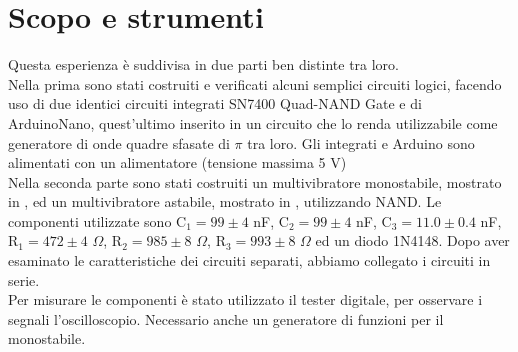 \section{Scopo e strumenti}
Questa esperienza è suddivisa in due parti ben distinte tra loro.\\
Nella prima sono stati costruiti e verificati alcuni semplici circuiti logici, facendo uso di due identici circuiti integrati SN7400 Quad-NAND 
Gate e di ArduinoNano, quest'ultimo inserito in un circuito che lo renda utilizzabile come generatore di onde quadre sfasate di $\pi$ tra loro. Gli integrati e Arduino sono alimentati con un alimentatore (tensione massima 5 V)\\
Nella seconda parte sono stati costruiti un multivibratore monostabile, mostrato in , ed un multivibratore astabile, mostrato in , utilizzando NAND. Le componenti utilizzate sono C$_1 = 99 \pm 4$ nF, C$_2 = 99 \pm 4$ nF, C$_3 = 11.0 \pm 0.4 $ nF, R$_1 = 472 \pm 4$ $\Omega$, R$_2 = 985 \pm 8$ $\Omega$, R$_3 = 993 \pm 8$ $\Omega$ ed un diodo 1N4148. Dopo aver esaminato le caratteristiche dei circuiti separati, abbiamo collegato i circuiti in serie.\\ %
Per misurare le componenti è stato utilizzato il tester digitale, per osservare i segnali l'oscilloscopio. Necessario anche un generatore di funzioni per il monostabile.

